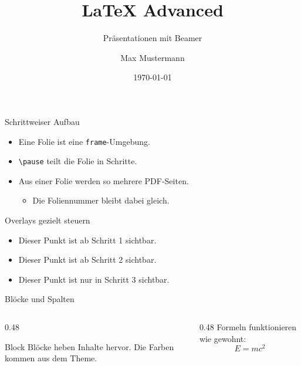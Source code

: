\documentclass[aspectratio=169,11pt]{beamer}
\title{\LaTeX{} Advanced}
\subtitle{Präsentationen mit Beamer}
\author{Max Mustermann}
\date{\today}
\begin{document}
\begin{frame}[plain]
  \titlepage
\end{frame}

\begin{frame}{Schrittweiser Aufbau}
  \begin{itemize}
    \item Eine Folie ist eine \texttt{frame}-Umgebung.
    \pause   %
    \item \texttt{\textbackslash pause} teilt die Folie in Schritte.
    \pause
    \item Aus einer Folie werden so mehrere PDF-Seiten.
      \begin{itemize}
        \item Die Foliennummer bleibt dabei gleich.
      \end{itemize}
  \end{itemize}
\end{frame}

\begin{frame}{Overlays gezielt steuern}
  \begin{itemize}
    \item<1-> Dieser Punkt ist ab Schritt 1 sichtbar.
    \item<2-> Dieser Punkt ist ab Schritt 2 sichtbar.
    \item<3>  Dieser Punkt ist nur in Schritt 3 sichtbar.
  \end{itemize}

  \bigskip
\end{frame}

\begin{frame}{Blöcke und Spalten}
  \begin{columns}[T]         %
    \begin{column}{0.48\textwidth}
      \begin{block}{Block}
        Blöcke heben Inhalte hervor. Die Farben kommen aus dem Theme.
      \end{block}
    \end{column}
    \begin{column}{0.48\textwidth}
      Formeln funktionieren wie gewohnt:
      \[
        E = mc^2
      \]
    \end{column}
  \end{columns}
\end{frame}
\end{document}
